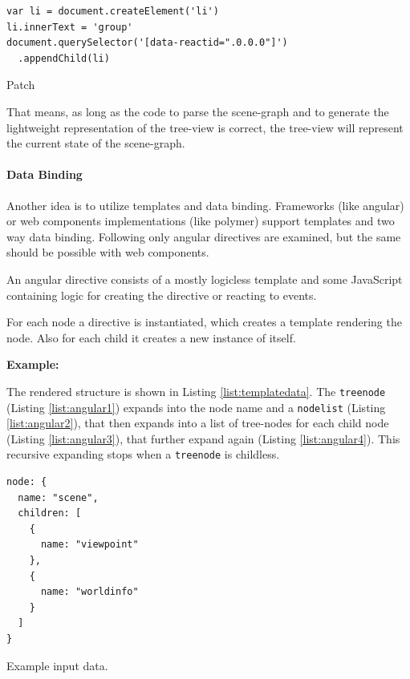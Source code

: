 \begin{listing}[H]
  \begin{verbatim}
var li = document.createElement('li')
li.innerText = 'group'
document.querySelector('[data-reactid=".0.0.0"]')
  .appendChild(li)
  \end{verbatim}
  \caption{Patch}
  \label{patch}
\end{listing}

That means, as long as the code to parse the scene-graph and to generate the
lightweight representation of the tree-view is correct, the tree-view will
represent the current state of the scene-graph.

\paragraph{Data Binding}
\label{data-binding}

Another idea is to utilize templates and data binding. Frameworks (like
angular) or web components implementations (like polymer)
support templates and two way data binding. Following only
angular directives are examined, but the same should be possible with web
components.

An angular directive consists of a mostly logicless template and some
JavaScript containing logic for creating the directive or reacting to
events.

For each node a directive is instantiated, which creates a template
rendering the node. Also for each child it creates a new instance of
itself.

\textbf{Example:}

The rendered structure is shown in Listing \ref{list:templatedata}. The
\texttt{treenode} (Listing \ref{list:angular1}) expands into the node name and a
\texttt{nodelist} (Listing \ref{list:angular2}), that then expands into a list
of tree-nodes for each child node (Listing \ref{list:angular3}), that further
expand again (Listing \ref{list:angular4}). This recursive expanding stops when a
\texttt{treenode} is childless.

\begin{listing}[H]
  \begin{verbatim}
node: {
  name: "scene",
  children: [
    {
      name: "viewpoint"
    },
    {
      name: "worldinfo"
    }
  ]
}
  \end{verbatim}
  \caption{Example input data.}
  \label{list:templatedata}
\end{listing}

